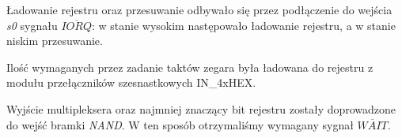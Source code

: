 \documentclass[fleqn]{article}
\begin{document}
Ładowanie rejestru oraz przesuwanie odbywało się przez podłączenie do wejścia \textit{s0} sygnału $\overline{IORQ}$: w stanie wysokim następowało ładowanie rejestru, a w stanie niskim przesuwanie.

Ilość wymaganych przez zadanie taktów zegara była ładowana do rejestru z modułu przełączników szesnastkowych IN\_4xHEX.

Wyjście multipleksera oraz najmniej znaczący bit rejestru zostały doprowadzone do wejść bramki \textit{NAND}. W ten sposób otrzymaliśmy wymagany sygnał $\overline{WAIT}$.



\begin{figure}[H]
	\centering




\end{figure}
\end{document}
